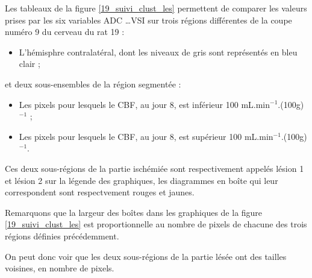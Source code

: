 Les tableaux de la figure \ref{19_suivi_clust_les} permettent de comparer les valeurs prises par les six variables ADC \dots VSI %
sur trois r\'egions diff\'erentes de la coupe num\'ero 9 du cerveau du rat 19 :
\begin{itemize}
\item L'h\'emisphre contralat\'eral, dont les niveaux de gris sont repr\'esent\'es en bleu clair ;
\end{itemize}

et deux sous-ensembles de la r\'egion segment\'ee :
\begin{itemize}
\item Les pixels pour lesquels le CBF, au jour 8, est inf\'erieur  100 mL.min${}^{-1}$.(100g)${}^{-1}$ ;
\item Les pixels pour lesquels le CBF, au jour 8, est sup\'erieur  100 mL.min${}^{-1}$.(100g)${}^{-1}$.
\end{itemize}

Ces deux sous-r\'egions de la partie isch\'emi\'ee sont respectivement appel\'es l\'esion 1 et l\'esion 2 sur la l\'egende des graphiques, %
les diagrammes en bo\^ite qui leur correspondent sont respectvement rouges et jaunes.

\par
Remarquons que la largeur des bo\^ites dans les graphiques de la figure \ref{19_suivi_clust_les} %
est proportionnelle au nombre de pixels de chacune des trois r\'egions d\'efinies pr\'ec\'edemment.

\par
On peut donc voir que les deux sous-r\'egions de la partie l\'es\'ee ont des tailles voisines, en nombre de pixels.

